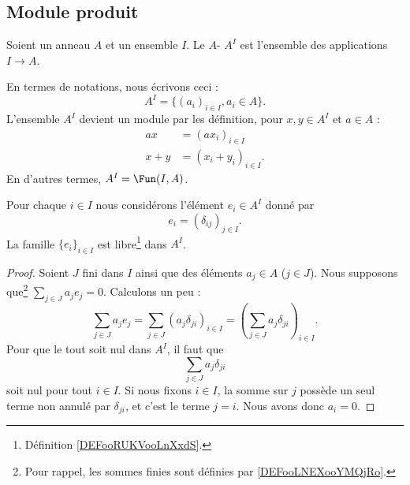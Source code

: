 \subsection{Module produit}

\begin{definition}        \label{DEFooLCJEooBvVmkV}
    Soient un anneau \( A\) et un ensemble \( I\). Le \( A\)- \( A^I\) est l'ensemble des applications \( I\to A\).

    En termes de notations, nous écrivons ceci :
    \begin{equation}
        A^I=\{ (a_i)_{i\in I},a_i\in A \}.
    \end{equation}
    L'ensemble \( A^I\) devient un module par les définition, pour \( x,y\in A^I\) et \( a\in A\) :
    \begin{subequations}
        \begin{align}
            ax&=(ax_i)_{i\in I}\\
            x+y&=(x_i+y_i)_{i\in I}     \label{EQooODBMooQKLUgd}.
        \end{align}
    \end{subequations}
    En d'autres termes, \( A^I=\Fun(I,A)\).
\end{definition}

\begin{lemma}
    Pour chaque \( i\in I\) nous considérons l'élément \( e_i\in A^I\) donné par
    \begin{equation}
        e_i=(\delta_{ij})_{j\in I}.
    \end{equation}
    La famille \( \{ e_i \}_{i\in I}\) est libre\footnote{Définition \ref{DEFooRUKVooLnXxdS}.} dans \( A^I\).
\end{lemma}

\begin{proof}
    Soient \( J\) fini dans \( I\) ainsi que des éléments \( a_j\in A\) (\( j\in J\)). Nous supposons que\footnote{Pour rappel, les sommes finies sont définies par \ref{DEFooLNEXooYMQjRo}.} \( \sum_{j\in J}a_je_j=0\). Calculons un peu :
    \begin{equation}
        \sum_{j\in J}a_je_j=\sum_{j\in J}(a_j\delta_{ji})_{i\in I}=\left( \sum_{j\in J}a_j\delta_{ji} \right)_{i\in I}.
    \end{equation}
    Pour que le tout soit nul dans \( A^I\), il faut que
    \begin{equation}
        \sum_{j\in J}a_j\delta_{ji}
    \end{equation}
    soit nul pour tout \( i\in I\). Si nous fixons \( i\in I\), la somme sur \( j\) possède un seul terme non annulé par \( \delta_{ji}\), et c'est le terme \( j=i\). Nous avons donc \( a_i=0\).
\end{proof}

